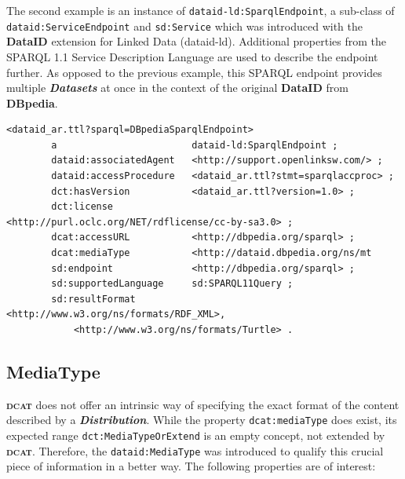 \documentclass[a4paper,english,twoside,BCOR1.5cm,headsepline,DIV12,appendixprefix,final,12pt]{scrbook}
\newcommand{\dataid}{{\ttfamily\bfseries DataID}\xspace}
\newcommand{\dcat}{{\scshape\bfseries dcat}\xspace}
\newcommand{\dbpedia}{{\ttfamily\bfseries DBpedia}\xspace}
\newcommand{\prop}[1]{{{\texttt{#1}}}}
\newcommand{\important}[1]{\textbf{\textit{#1}}}
\begin{document}
The second example is an instance of \prop{dataid-ld:SparqlEndpoint}, a sub-class of \prop{dataid:ServiceEndpoint} and \prop{sd:Service} which was introduced with the \dataid extension for Linked Data (dataid-ld). Additional properties from the SPARQL 1.1 Service Description Language are used to describe the endpoint further. As opposed to the previous example, this SPARQL endpoint provides multiple \important{Datasets} at once in the context of the original \dataid from \dbpedia.
\\
\begin{lstlisting}[language=ttl, captionpos=b,caption=Distribution of a SPARQL endpoint,label=lst:coresuperset,linewidth=\columnwidth,breaklines=true]
<dataid_ar.ttl?sparql=DBpediaSparqlEndpoint>
        a                        dataid-ld:SparqlEndpoint ;
        dataid:associatedAgent   <http://support.openlinksw.com/> ;                                               
        dataid:accessProcedure   <dataid_ar.ttl?stmt=sparqlaccproc> ;                                             
        dct:hasVersion           <dataid_ar.ttl?version=1.0> ;
        dct:license              <http://purl.oclc.org/NET/rdflicense/cc-by-sa3.0> ;
        dcat:accessURL           <http://dbpedia.org/sparql> ;                                                    
        dcat:mediaType           <http://dataid.dbpedia.org/ns/mt
        sd:endpoint              <http://dbpedia.org/sparql> ;                                                    
        sd:supportedLanguage     sd:SPARQL11Query ;                                                               
        sd:resultFormat          <http://www.w3.org/ns/formats/RDF_XML>,                                          
            <http://www.w3.org/ns/formats/Turtle> .  
\end{lstlisting}

\subsection{MediaType} 
\label{sec:coremediatype}
\dcat does not offer an intrinsic way of specifying the exact format of the content described by a \important{Distribution}. While the property \prop{dcat:mediaType} does exist, its expected range \prop{dct:MediaTypeOrExtend} is an empty concept, not extended by \dcat. Therefore, the \prop{dataid:MediaType} was introduced to qualify this crucial piece of information in a better way. The following properties are of interest:
\end{document}
